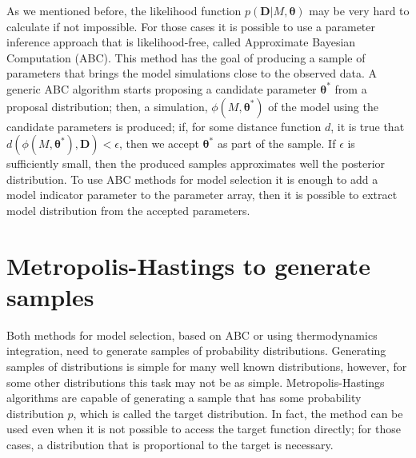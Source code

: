 As we mentioned before, the likelihood function 
$p({\bm D} | M, {\bm \theta})$ may be very hard to calculate if not 
impossible. For those cases it is possible to use a parameter inference
approach that is likelihood-free, called Approximate Bayesian 
Computation (ABC). This method has the goal of producing a sample of 
parameters that brings the model simulations close to the observed data.
A generic ABC algorithm starts proposing a candidate parameter 
${\bm \theta}^*$ from a proposal distribution; then, a simulation, 
$\phi (M, {\bm \theta}^*)$ of the model using the candidate parameters
is produced; if, for some distance function $d$, it is true that 
$d(\phi(M, {\bm \theta}^*), {\bm D}) < \epsilon$, then we accept 
${\bm \theta}^*$ as part of the sample. If $\epsilon$ is sufficiently 
small, then the produced samples approximates well the posterior 
distribution. To use ABC methods for model selection it is enough to add
a model indicator parameter to the parameter array, then it is possible
to extract model distribution from the accepted parameters.

\section{Metropolis-Hastings to generate samples}
Both methods for model selection, based on ABC or using thermodynamics
integration, need to generate samples of probability distributions. 
Generating samples of distributions is simple for many well known 
distributions, however, for some other distributions this task may not 
be as simple. Metropolis-Hastings algorithms are capable of generating a 
sample that has some probability distribution $p$, which is called the 
target distribution. In fact, the method can be used even when it is not
possible to access the target function directly; for those cases, a 
distribution that is proportional to the target is necessary.

